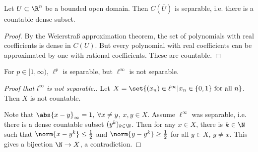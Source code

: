 \documentclass{article}
\begin{document}
\begin{cor}
    Let $U \subset \R^n$ be a bounded open domain. Then $C(\overline{U})$ is separable, i.e. there is a countable dense subset.
\end{cor}

\begin{proof}
    By the Weierstra{\ss} approximation theorem, the set of polynomials with real coefficients is dense in $C(U)$.
    But every polynomial with real coefficients can be approximated by one with rational coefficients.
    These are countable.
\end{proof}

\begin{remark}
    For $p \in [1, \infty)$, $\ell^p$ is separable, but $\ell^\infty$ is not separable.
\end{remark}

\begin{proof}[Proof that $l^\infty$ is not separable.]
    Let $X = \set{(x_n) \in \ell^\infty | x_n \in \{0, 1\} \text{ for all } n}$.
    Then $X$ is not countable.

    Note that $\abs{x - y}_\infty = 1, \; \forall x \neq y$, $x, y \in X$.
    Assume $\ell^\infty$ was separable, i.e. there is a dense countable subset $(y^k)_{k \in \N}$.
    Then for any $x \in X$, there is $k \in \N$ such that $\norm{x - y^k} \leq \frac{1}{2}$ and $\norm{y - y^k} \geq \frac{1}{2}$ for all $y \in X$, $y \neq x$.
    This gives a bijection $\N \to X$, a contradiction. %
\end{proof}
\end{document}
